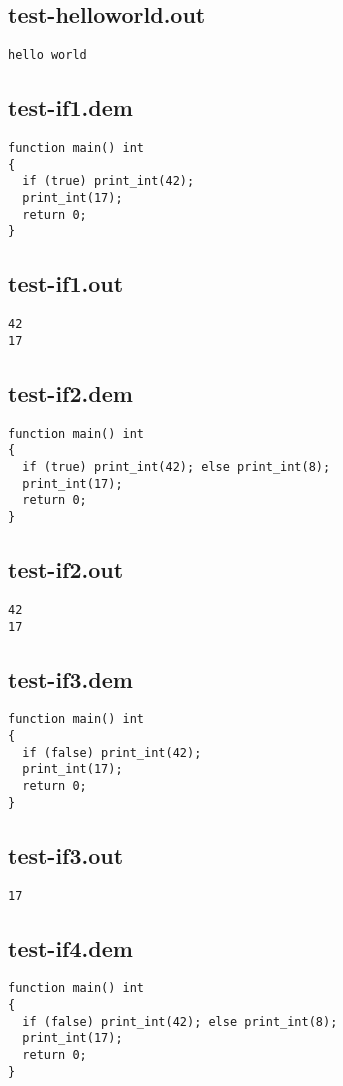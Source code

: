 \subsection{test-helloworld.out}
\begin{lstlisting}
hello world
\end{lstlisting}
\subsection{test-if1.dem}
\begin{lstlisting}
function main() int
{
  if (true) print_int(42);
  print_int(17);
  return 0;
}
\end{lstlisting}
\subsection{test-if1.out}
\begin{lstlisting}
42
17
\end{lstlisting}
\subsection{test-if2.dem}
\begin{lstlisting}
function main() int
{
  if (true) print_int(42); else print_int(8);
  print_int(17);
  return 0;
}
\end{lstlisting}
\subsection{test-if2.out}
\begin{lstlisting}
42
17
\end{lstlisting}
\subsection{test-if3.dem}
\begin{lstlisting}
function main() int
{
  if (false) print_int(42);
  print_int(17);
  return 0;
}
\end{lstlisting}
\subsection{test-if3.out}
\begin{lstlisting}
17
\end{lstlisting}
\subsection{test-if4.dem}
\begin{lstlisting}
function main() int
{
  if (false) print_int(42); else print_int(8);
  print_int(17);
  return 0;
}
\end{lstlisting}
